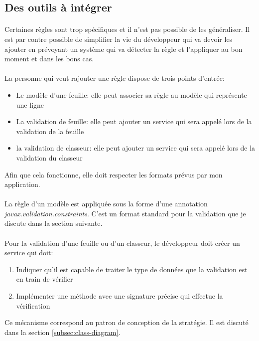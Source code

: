 \subsection{Des outils à intégrer}
\label{subsec:host-tools}

\paragraph{}
Certaines règles sont trop spécifiques et il n'est pas possible de les généraliser.
Il est par contre possible de simplifier la vie du développeur qui va devoir les ajouter en prévoyant un système qui va détecter la règle et l'appliquer au bon moment et dans les bons cas.

\paragraph{}
La personne qui veut rajouter une règle dispose de trois points d'entrée:
\begin{itemize}
    \item Le modèle d'une feuille: elle peut associer sa règle au modèle qui représente une ligne
    \item La validation de feuille: elle peut ajouter un service qui sera appelé lors de la validation de la feuille
    \item la validation de classeur: elle peut ajouter un service qui sera appelé lors de la validation du classeur
\end{itemize}
Afin que cela fonctionne, elle doit respecter les formats prévus par mon application.

\paragraph{}
La règle d'un modèle est appliquée sous la forme d'une annotation \textit{javax.validation.constraints}.
C'est un format standard pour la validation que je discute dans la section suivante.

\paragraph{}
Pour la validation d'une feuille ou d'un classeur, le développeur doit créer un service qui doit:
\begin{enumerate}
    \item Indiquer qu'il est capable de traiter le type de données que la validation est en train de vérifier
    \item Implémenter une méthode avec une signature précise qui effectue la vérification
\end{enumerate}
Ce mécanisme correspond au patron de conception de la stratégie.
Il est discuté dans la section \ref{subsec:class-diagram}.
